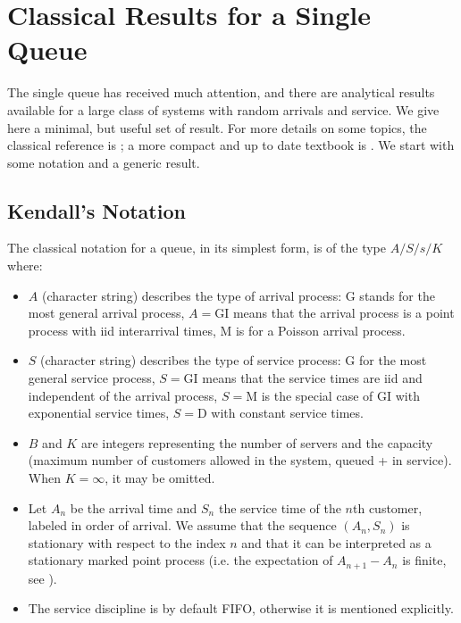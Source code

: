 

\section{Classical Results for a Single Queue}
\label{sec-q-sq} The single queue has received
much attention, and there are analytical results
available for a large class of systems with
random arrivals and service. We give here a
minimal, but useful set of result. For more
details on some topics, the classical reference
is \cite{kleinrock-75-a,kleinrock-75-b}; a more
compact and up to date textbook is
\cite{nain-basic}. We start with some notation
and a generic result.

\subsection{Kendall's Notation}
The classical notation
for a queue, in its simplest form, is of the type
$A/S/s/K$ where:
\begin{itemize}
  \item $A$ (character string) describes the type of arrival process: G stands for the most general
arrival process, $A=$GI means that the arrival
process is a
  point process with iid interarrival times, M is for a Poisson arrival process.
  \item $S$ (character string) describes
the type of service process: G for the most
general service process, $S=$GI means that the
service times
  are iid and independent of the arrival process, $S=$M is the special case of GI with
  exponential service times, $S=$D with constant service times.
  \item $B$ and $K$ are integers representing the number of servers and the capacity (maximum number of
  customers allowed in the system, queued + in service). When $K=\infty$, it may be omitted.
  \item Let $A_n$ be the arrival time and $S_n$ the service time of the
$n$th customer, labeled in order of arrival. We
assume that the sequence $(A_n, S_n)$ is
stationary with respect to the index $n$ and that
it can be interpreted as a stationary marked
point process (i.e. the expectation of
$A_{n+1}-A_n$ is finite, see
).
 \item The service discipline is by default FIFO, otherwise it is mentioned explicitly.
\end{itemize}%

